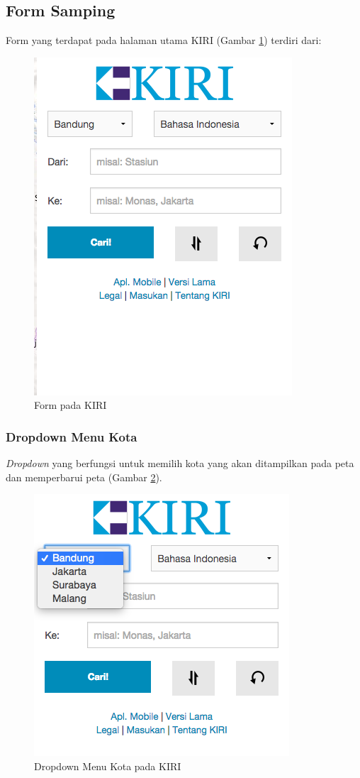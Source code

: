 \subsection{Form Samping}
Form yang terdapat pada halaman utama KIRI (Gambar \ref{fig:4_KIRI_form}) terdiri dari:
\begin{figure}[H]
	\centering
	\includegraphics[scale=0.5]{Gambar/KIRI-form}
	\caption{Form pada KIRI} 
	\label{fig:4_KIRI_form}
\end{figure}

\subsubsection{Dropdown Menu Kota}
\textit{Dropdown} yang berfungsi untuk memilih kota yang akan ditampilkan pada peta dan memperbarui peta (Gambar \ref{fig:4_KIRI_drop_kota}).

\begin{figure}[H]
	\centering
	\includegraphics[scale=0.5]{Gambar/KIRI-drop-kota}
	\caption{Dropdown Menu Kota pada KIRI} 
	\label{fig:4_KIRI_drop_kota}
\end{figure}


